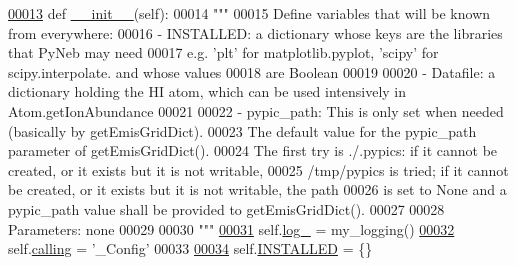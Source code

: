 \begin{DoxyCode}
\hypertarget{classpyneb_1_1utils_1_1_config_1_1___config_l00013}{}\hyperlink{classpyneb_1_1utils_1_1_config_1_1___config_aa11fc0ec5216188162c802fbe5815fc2}{00013}     \textcolor{keyword}{def }\hyperlink{classpyneb_1_1utils_1_1_config_1_1___config_aa11fc0ec5216188162c802fbe5815fc2}{\_\_init\_\_}(self):
00014         \textcolor{stringliteral}{"""}
00015 \textcolor{stringliteral}{        Define variables that will be known from everywhere:}
00016 \textcolor{stringliteral}{        - INSTALLED: a dictionary whose keys are the libraries that PyNeb may need}
00017 \textcolor{stringliteral}{            e.g. 'plt' for matplotlib.pyplot, 'scipy' for scipy.interpolate. and whose values}
00018 \textcolor{stringliteral}{            are Boolean}
00019 \textcolor{stringliteral}{        }
00020 \textcolor{stringliteral}{        - Datafile: a dictionary holding the HI atom, which can be used intensively in Atom.getIonAbundance}
00021 \textcolor{stringliteral}{        }
00022 \textcolor{stringliteral}{        - pypic\_path: This is only set when needed (basically by getEmisGridDict).}
00023 \textcolor{stringliteral}{            The default value for the pypic\_path parameter of getEmisGridDict().}
00024 \textcolor{stringliteral}{            The first try is ./.pypics: if it cannot be created, or it exists but it is not writable, }
00025 \textcolor{stringliteral}{            /tmp/pypics is tried; if it cannot be created, or it exists but it is not writable, the path}
00026 \textcolor{stringliteral}{            is set to None and a pypic\_path value shall be provided to getEmisGridDict().}
00027 \textcolor{stringliteral}{        }
00028 \textcolor{stringliteral}{        Parameters: none}
00029 \textcolor{stringliteral}{        }
00030 \textcolor{stringliteral}{        """}
\hypertarget{classpyneb_1_1utils_1_1_config_1_1___config_l00031}{}\hyperlink{classpyneb_1_1utils_1_1_config_1_1___config_a8304de6467642234fcf5a7ae1e7a16bd}{00031}         self.\hyperlink{classpyneb_1_1utils_1_1_config_1_1___config_a8304de6467642234fcf5a7ae1e7a16bd}{log\_} = my\_logging()
\hypertarget{classpyneb_1_1utils_1_1_config_1_1___config_l00032}{}\hyperlink{classpyneb_1_1utils_1_1_config_1_1___config_abf04542e5670abea107260ca7a6baf6d}{00032}         self.\hyperlink{classpyneb_1_1utils_1_1_config_1_1___config_abf04542e5670abea107260ca7a6baf6d}{calling} = \textcolor{stringliteral}{'\_Config'}
00033         
\hypertarget{classpyneb_1_1utils_1_1_config_1_1___config_l00034}{}\hyperlink{classpyneb_1_1utils_1_1_config_1_1___config_ae07a752629612175b8000d374904b22a}{00034}         self.\hyperlink{classpyneb_1_1utils_1_1_config_1_1___config_ae07a752629612175b8000d374904b22a}{INSTALLED} = \{\}

\end{DoxyCode}
